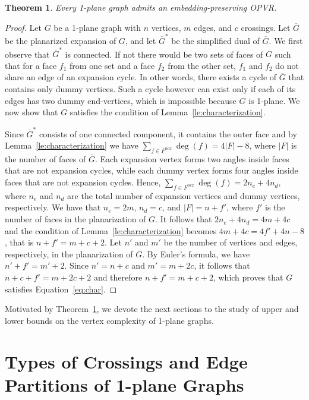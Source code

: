 \documentclass{article}
\newtheorem{theorem}{Theorem}
\newcommand{\opvr}{OPVR\xspace}
\newcommand{\bG}{\overline{G}}
\begin{document}
\begin{theorem}\label{th:1-planar}
Every 1-plane graph admits an embedding-preserving \opvr.
\end{theorem}
\begin{proof}
Let $G$ be a 1-plane graph with $n$ vertices, $m$ edges, and $c$ crossings.
Let $\bG$ be the planarized expansion of $G$, and let $\bG^*$ be the simplified dual of $\bG$. We first observe that $\bG^*$ is connected. If not  there would be two sets of faces of $G$ such that for a face $f_1$ from one set and a face $f_2$ from the other set, $f_1$ and $f_2$ do not share an edge of an expansion cycle. In other words, there exists  a cycle of $\bG$ that contains only dummy vertices. Such a cycle however can exist only if each of its edges has two dummy end-vertices, which is impossible because $G$ is 1-plane. We now show that $G$ satisfies the condition of Lemma~\ref{le:characterization}.

Since $\bG^*$ consists of one connected component, it contains the outer face and by Lemma~\ref{le:characterization} we have $\sum_{f \in F^{nex}}\deg(f)=4|F|-8$, where $|F|$ is the number of faces of $\bG$.  Each expansion vertex forms two angles inside faces that are not expansion cycles, while each dummy vertex forms four angles inside faces that are not expansion cycles. Hence, $\sum_{f \in F^{nex}}\deg(f)=2n_e+4n_d$, where $n_e$ and $n_d$ are the total number of expansion vertices and dummy vertices, respectively. We have that $n_e=2m$, $n_d=c$, and $|F|=n+f'$,  where $f'$ is the number of faces in the planarization of $G$.
 It follows that $2n_e+4n_d = 4m +4c$ and the condition of Lemma~\ref{le:characterization} becomes $4m+4c=4f'+4n-8$, that is $n+f'=m+c+2$. Let $n'$ and $m'$ be the number of vertices and edges, respectively, in the planarization of $G$. By  Euler's formula, we have $n'+f'=m'+2$. Since $n'=n+c$ and $m'=m+2c$, it follows that $n+c+f'=m+2c+2$ and therefore $n+f'=m+c+2$, which proves that $G$ satisfies Equation~\ref{eq:char}.
\end{proof}


Motivated by Theorem~\ref{th:1-planar}, we devote the next sections to the study of upper and lower bounds on the vertex complexity of 1-plane graphs. 



\section{Types of Crossings and Edge Partitions of 1-plane Graphs}\label{se:background-edgepartitions}
\end{document}

